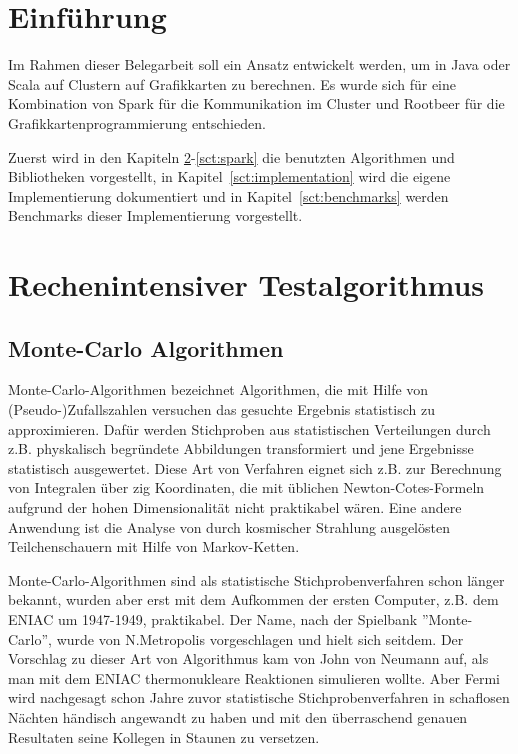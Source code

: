 \chapter{Einführung}
Im Rahmen dieser Belegarbeit soll ein Ansatz entwickelt werden, um in Java oder Scala auf Clustern auf Grafikkarten zu berechnen. Es wurde sich für eine Kombination von Spark für die Kommunikation im Cluster und Rootbeer für die Grafikkartenprogrammierung entschieden.

Zuerst wird in den Kapiteln \ref{sct:montecarloalgo}-\ref{sct:spark} die benutzten Algorithmen und Bibliotheken vorgestellt, in Kapitel~\ref{sct:implementation} wird die eigene Implementierung dokumentiert und in Kapitel~\ref{sct:benchmarks} werden Benchmarks dieser Implementierung vorgestellt.


\chapter{Rechenintensiver Testalgorithmus}
\label{sct:montecarloalgo}

\section{Monte-Carlo Algorithmen}

Monte-Carlo-Algorithmen bezeichnet Algorithmen, die mit Hilfe von (Pseudo-)Zufallszahlen versuchen das gesuchte Ergebnis statistisch zu approximieren. Dafür werden Stichproben aus statistischen Verteilungen durch z.B. physkalisch begründete Abbildungen transformiert und jene Ergebnisse statistisch ausgewertet. Diese Art von Verfahren eignet sich z.B. zur Berechnung von Integralen über zig Koordinaten, die mit üblichen Newton-Cotes-Formeln aufgrund der hohen Dimensionalität nicht praktikabel wären. Eine andere Anwendung ist die Analyse von durch kosmischer Strahlung ausgelösten Teilchenschauern mit Hilfe von Markov-Ketten\cite{metropolis1949monte}.

Monte-Carlo-Algorithmen sind als statistische Stichprobenverfahren schon länger bekannt, wurden aber erst mit dem Aufkommen der ersten Computer, z.B. dem ENIAC um 1947-1949, praktikabel\cite{metropolis1987beginning}. Der Name, nach der Spielbank ''Monte-Carlo'', wurde von N.Metropolis vorgeschlagen und hielt sich seitdem. Der Vorschlag zu dieser Art von Algorithmus kam von John von Neumann auf, als man mit dem ENIAC thermonukleare Reaktionen simulieren wollte. Aber Fermi wird nachgesagt schon Jahre zuvor statistische Stichprobenverfahren in schaflosen Nächten händisch angewandt zu haben und mit den überraschend genauen Resultaten seine Kollegen in Staunen zu versetzen.

